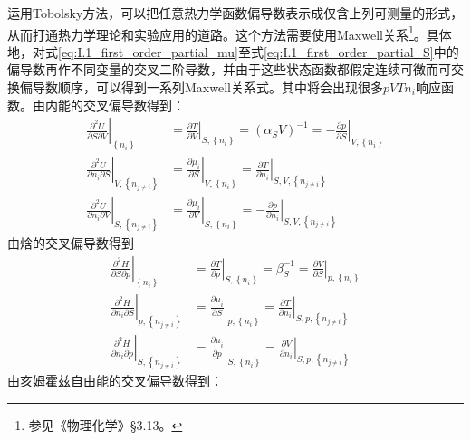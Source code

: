 \documentclass[main.tex]{subfiles}
\begin{document}
运用Tobolsky方法\cite{Tobolsky1942}，可以把任意热力学函数偏导数表示成仅含上列可测量的形式，从而打通热力学理论和实验应用的道路。这个方法需要使用Maxwell关系\footnote{参见《物理化学》\S 3.13。}。具体地，对式\eqref{eq:I.1_first_order_partial_mu}至式\eqref{eq:I.1_first_order_partial_S}中的偏导数再作不同变量的交叉二阶导数，并由于这些状态函数都假定连续可微而可交换偏导数顺序，可以得到一系列Maxwell关系式。其中将会出现很多$pVTn_i$响应函数。由内能的交叉偏导数得到：
\begin{align}
    \left.\frac{\partial^2 U}{\partial S\partial V}\right|_{\left\{n_i\right\}}             & =\left.\frac{\partial T}{\partial V}\right|_{S,\left\{n_i\right\}}=\left(\alpha_S V\right)^{-1}=-\left.\frac{\partial p}{\partial S}\right|_{V,\left\{n_i\right\}}\label{eq:I.1_Maxwell_USV} \\
    \left.\frac{\partial ^2U}{\partial n_i\partial S}\right|_{V,\left\{n_{j\neq i}\right\}} & =\left.\frac{\partial \mu_i}{\partial S}\right|_{V,\left\{n_i\right\}}=\left.\frac{\partial T}{\partial n_i}\right|_{S,V,\left\{n_{j\neq i}\right\}}\label{eq:I.1_Maxwell_UnS}               \\
    \left.\frac{\partial ^2U}{\partial n_i\partial V}\right|_{S,\left\{n_{j\neq i}\right\}} & =\left.\frac{\partial \mu_i}{\partial V}\right|_{S,\left\{n_i\right\}}=-\left.\frac{\partial p}{\partial n_i}\right|_{S,V,\left\{n_{j\neq i}\right\}}\label{eq:I.1_Maxwell_UnV}
\end{align}
由焓的交叉偏导数得到
\begin{align}
    \left.\frac{\partial^2 H}{\partial S\partial p}\right|_{\left\{n_i\right\}}             & =\left.\frac{\partial T}{\partial p}\right|_{S,\left\{n_i\right\}}=\beta_S^{-1}=\left.\frac{\partial V}{\partial S}\right|_{p,\left\{n_i\right\}}\label{eq:I.1_Maxwell_HSp}    \\
    \left.\frac{\partial ^2H}{\partial n_i\partial S}\right|_{p,\left\{n_{j\neq i}\right\}} & =\left.\frac{\partial \mu_i}{\partial S}\right|_{p,\left\{n_i\right\}}=\left.\frac{\partial T}{\partial n_i}\right|_{S,p,\left\{n_{j\neq i}\right\}}\label{eq:I.1_Maxwell_HnS} \\
    \left.\frac{\partial ^2H}{\partial n_i\partial p}\right|_{S,\left\{n_{j\neq i}\right\}} & =\left.\frac{\partial \mu_i}{\partial p}\right|_{S,\left\{n_i\right\}}=\left.\frac{\partial V}{\partial n_i}\right|_{S,p,\left\{n_{j\neq i}\right\}}\label{eq:I.1_Maxwell_Hnp}
\end{align}
由亥姆霍兹自由能的交叉偏导数得到：
\end{document}
